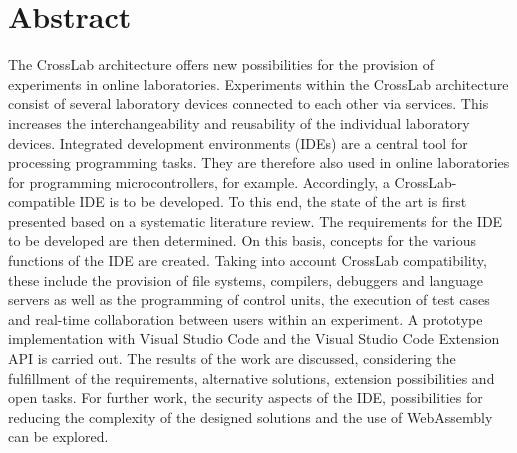 \section*{Abstract}
The CrossLab architecture offers new possibilities for the provision of experiments in online laboratories. Experiments within the CrossLab architecture consist of several laboratory devices connected to each other via services. This increases the interchangeability and reusability of the individual laboratory devices. Integrated development environments (IDEs) are a central tool for processing programming tasks. They are therefore also used in online laboratories for programming microcontrollers, for example. Accordingly, a CrossLab-compatible IDE is to be developed. To this end, the state of the art is first presented based on a systematic literature review. The requirements for the IDE to be developed are then determined. On this basis, concepts for the various functions of the IDE are created. Taking into account CrossLab compatibility, these include the provision of file systems, compilers, debuggers and language servers as well as the programming of control units, the execution of test cases and real-time collaboration between users within an experiment. A prototype implementation with Visual Studio Code and the Visual Studio Code Extension API is carried out.  The results of the work are discussed, considering the fulfillment of the requirements, alternative solutions, extension possibilities and open tasks. For further work, the security aspects of the IDE, possibilities for reducing the complexity of the designed solutions and the use of WebAssembly can be explored.